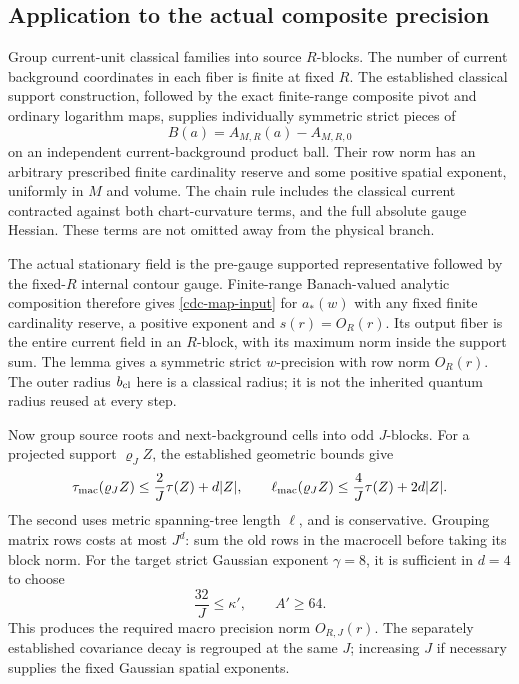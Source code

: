 \subsection{Application to the actual composite precision}
\label{cdc-actual-precision-section}

Group current-unit classical families into source $R$-blocks.
The number of current background coordinates in each fiber is
finite at fixed $R$. The established classical support
construction, followed by the exact finite-range composite pivot
and ordinary logarithm maps, supplies individually symmetric
strict pieces of
\begin{equation}
 B(a)=A_{M,R}(a)-A_{M,R,0}
 \label{cdc-actual-precision}
\end{equation}
on an independent current-background product ball. Their row
norm has an arbitrary prescribed finite cardinality reserve and
some positive spatial exponent, uniformly in $M$ and volume.
The chain rule includes the classical current contracted against
both chart-curvature terms, and the full absolute gauge Hessian.
These terms are not omitted away from the physical branch.

The actual stationary field is the pre-gauge supported
representative followed by the fixed-$R$ internal contour gauge.
Finite-range Banach-valued analytic composition therefore gives
\eqref{cdc-map-input} for $a_*(w)$ with any fixed finite
cardinality reserve, a positive exponent and $s(r)=O_R(r)$.
Its output fiber is the entire current field in an $R$-block,
with its maximum norm inside the support sum. The lemma gives
a symmetric strict $w$-precision with row norm $O_R(r)$.
The outer radius $b_{\rm cl}$ here is a classical radius; it is
not the inherited quantum radius reused at every step.

Now group source roots and next-background cells into odd
$J$-blocks. For a projected support $\varrho_J Z$, the established
geometric bounds give
\begin{equation}
 \tau_{\rm mac}(\varrho_JZ)
       \leq\frac2J\tau(Z)+d|Z|,\qquad
 \ell_{\rm mac}(\varrho_JZ)
       \leq\frac4J\tau(Z)+2d|Z|.
 \label{cdc-projection}
\end{equation}
The second uses metric spanning-tree length $\ell$, and is
conservative. Grouping matrix rows costs at most $J^d$:
sum the old rows in the macrocell before taking its block norm.
For the target strict Gaussian exponent $\gamma=8$, it is
sufficient in $d=4$ to choose
\begin{equation}
 \frac{32}{J}\leq\kappa',\qquad A'\geq64.
 \label{cdc-precision-reserve}
\end{equation}
This produces the required macro precision norm $O_{R,J}(r)$.
The separately established covariance decay is regrouped at the
same $J$; increasing $J$ if necessary supplies the fixed
Gaussian spatial exponents.

